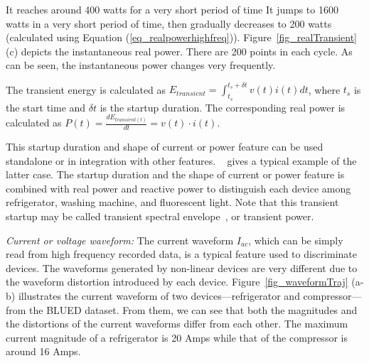 It reaches around 400 watts for a very short period of time 
\fi 
It jumps to 1600 watts in a very short period of time, then gradually decreases to 200 watts (calculated using
Equation (\ref{eq_realpowerhighfreq})).
Figure~\ref{fig_realTransient} (c) depicts the instantaneous real power. 
There are 200 points in each cycle. As can be seen, the
instantaneous power changes very frequently.

The transient energy %
is calculated as 
$E_{transient} = \int_{t_s}^{t_s+\delta t} v(t)i(t)dt $, 
where $t_s$ is the start time and $\delta t$ is the startup duration. 
The corresponding real power is calculated as 
$P(t) = \frac{dE_{transient(t)}}{dt} = v(t)\cdot i(t)$.
\iffalse
\manishc{this is confusing, is ``transient power'' ``transient real power''?
  what is the unit of transient power? is it Watts? from your equation of
  $P_{transient}$ it appears to be Watt Second? can you verify these
  equations, and explain how transient power is different from real power. I
  initially thought that transient power is just the power during the
  transient period; is that correct?}\huijuanc{already verified the equation and changed it.}
\fi  

This startup duration and shape of current or power feature can be used 
standalone or in integration with other features.
~\cite{sultanem1991using} gives a typical example of the latter case. 
The startup duration and the shape of current or power feature 
is combined with real power and reactive power
to distinguish each device among refrigerator, washing machine, and fluorescent light.
Note that 
this transient startup may be called transient spectral envelope~\cite{shaw2000PhdThesis}, 
or transient power. 

\textit{Current or voltage waveform:}
The current waveform $I_{ac}$, which can be simply read from
high frequency recorded data,
is a typical feature used to discriminate devices.
The waveforms generated by non-linear devices  are 
very different due to the waveform distortion 
introduced by each device. 
Figure~\ref{fig_waveformTraj} (a-b)
illustrates the current waveform 
of two devices---refrigerator and compressor---from the
BLUED dataset. 
From them, we can see that both the magnitudes  and the distortions 
of the current waveforms differ from each other. 
The maximum current magnitude of a refrigerator is 20 Amps while that of 
the compressor is around 16 Amps. 
% 


